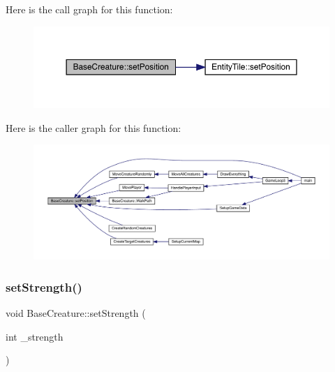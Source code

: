 Here is the call graph for this function\+:
\nopagebreak
\begin{figure}[H]
\begin{center}
\leavevmode
\includegraphics[width=350pt]{class_base_creature_a00ffc1ee732a8f0a8921c9cee6842e4d_cgraph}
\end{center}
\end{figure}
Here is the caller graph for this function\+:
\nopagebreak
\begin{figure}[H]
\begin{center}
\leavevmode
\includegraphics[width=350pt]{class_base_creature_a00ffc1ee732a8f0a8921c9cee6842e4d_icgraph}
\end{center}
\end{figure}
\mbox{\label{class_base_creature_a3a2eb318b9c5d849a02884b20e32f83d}} 
\subsubsection{\texorpdfstring{set\+Strength()}{setStrength()}}
{\footnotesize\ttfamily void Base\+Creature\+::set\+Strength (\begin{DoxyParamCaption}\item[{int}]{\+\_\+strength }\end{DoxyParamCaption})}

